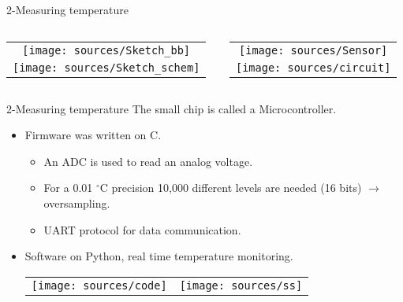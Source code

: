 \documentclass[handout]{beamer}
\begin{document}
\begin{frame}{2-Measuring temperature}
	\begin{columns}
		\begin{column}{0.65\textwidth}
			\begin{tabular}{c}
				\texttt{[image: sources/Sketch\_bb]} \\
				\texttt{[image: sources/Sketch\_schem]}
			\end{tabular}
		\end{column}
		\begin{column}{0.35\textwidth}
			\begin{tabular}{c}
				\texttt{[image: sources/Sensor]} \\
				\texttt{[image: sources/circuit]}
			\end{tabular}
		\end{column}
	\end{columns}
\end{frame}

\begin{frame}{2-Measuring temperature}
	The small chip is called a Microcontroller.
	\begin{itemize}
		\item Firmware was written on C.
		\begin{itemize}
			\item An ADC is used to read an analog voltage.
			\item For a 0.01 $^\circ$C precision 10,000 different levels are needed (16 bits) $\longrightarrow$ oversampling.
			\item UART protocol for data communication.
		\end{itemize}
		\item Software on Python, real time temperature monitoring.
		
		\begin{table}[h]
			\begin{tabular}{cc}
				\texttt{[image: sources/code]} & 
				\texttt{[image: sources/ss]}
			\end{tabular}
		\end{table}
	\end{itemize} 
\end{frame}
\end{document}
